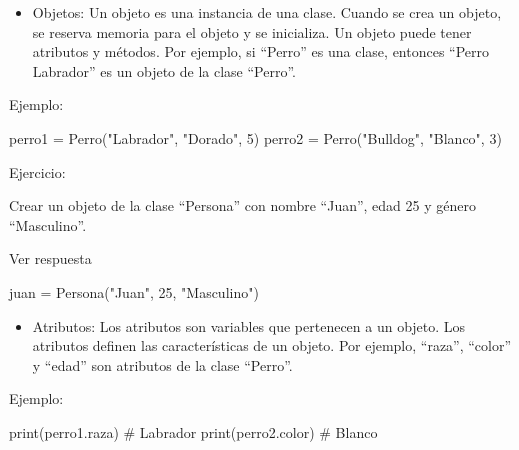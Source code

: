 \documentclass[
  a4paper,
  DIV=11,
  numbers=noendperiod,
  onepage,
  openany]{scrreprt}
\newenvironment{Shaded}{\begin{snugshade}}{\end{snugshade}}
\newcommand{\BuiltInTok}[1]{\textcolor[rgb]{0.00,0.23,0.31}{#1}}
\newcommand{\CommentTok}[1]{\textcolor[rgb]{0.37,0.37,0.37}{#1}}
\newcommand{\DecValTok}[1]{\textcolor[rgb]{0.68,0.00,0.00}{#1}}
\newcommand{\NormalTok}[1]{\textcolor[rgb]{0.00,0.23,0.31}{#1}}
\newcommand{\OperatorTok}[1]{\textcolor[rgb]{0.37,0.37,0.37}{#1}}
\newcommand{\StringTok}[1]{\textcolor[rgb]{0.13,0.47,0.30}{#1}}
\providecommand{\tightlist}{%
  \setlength{\itemsep}{0pt}\setlength{\parskip}{0pt}}\usepackage{longtable,booktabs,array}
\begin{document}
\begin{itemize}
\tightlist
\item
  Objetos: Un objeto es una instancia de una clase. Cuando se crea un
  objeto, se reserva memoria para el objeto y se inicializa. Un objeto
  puede tener atributos y métodos. Por ejemplo, si ``Perro'' es una
  clase, entonces ``Perro Labrador'' es un objeto de la clase ``Perro''.
\end{itemize}

Ejemplo:

\begin{Shaded}
\begin{Highlighting}[]
\NormalTok{perro1 }\OperatorTok{=}\NormalTok{ Perro(}\StringTok{"Labrador"}\NormalTok{, }\StringTok{"Dorado"}\NormalTok{, }\DecValTok{5}\NormalTok{)}
\NormalTok{perro2 }\OperatorTok{=}\NormalTok{ Perro(}\StringTok{"Bulldog"}\NormalTok{, }\StringTok{"Blanco"}\NormalTok{, }\DecValTok{3}\NormalTok{)}
\end{Highlighting}
\end{Shaded}

Ejercicio:

Crear un objeto de la clase ``Persona'' con nombre ``Juan'', edad 25 y
género ``Masculino''.

Ver respuesta

\begin{Shaded}
\begin{Highlighting}[]
\NormalTok{juan }\OperatorTok{=}\NormalTok{ Persona(}\StringTok{"Juan"}\NormalTok{, }\DecValTok{25}\NormalTok{, }\StringTok{"Masculino"}\NormalTok{)}
\end{Highlighting}
\end{Shaded}

\begin{itemize}
\tightlist
\item
  Atributos: Los atributos son variables que pertenecen a un objeto. Los
  atributos definen las características de un objeto. Por ejemplo,
  ``raza'', ``color'' y ``edad'' son atributos de la clase ``Perro''.
\end{itemize}

Ejemplo:

\begin{Shaded}
\begin{Highlighting}[]
\BuiltInTok{print}\NormalTok{(perro1.raza)  }\CommentTok{\# Labrador}
\BuiltInTok{print}\NormalTok{(perro2.color)  }\CommentTok{\# Blanco}
\end{Highlighting}
\end{Shaded}
\end{document}
